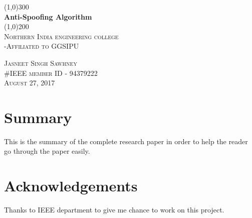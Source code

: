\documentclass{article}
\begin{document}
\begin{comment}
this is used to comment out lines.
\title{Robust Anti-Spoofing Algorithm}
\author{Innovative Coder}
\date{August 27, 2017}
\maketitle
above written code will print the report in very lame format 
the code written below is improved.
\end{comment}
\begin{titlepage}
	\begin{center}
	\line(1,0){300}\\
	[0.25 in]
	\huge{\bfseries Anti-Spoofing Algorithm}\\
	[2mm]
	\line(1,0){200}\\
	[1.5mm]
	\textsc{\LARGE Northern India engineering college}\\
	[0.75mm]
	\textsc{\Large -Affiliated to GGSIPU}\\
	[12.5cm]
	\end{center}
	
	\begin{flushright}  %
	\textsc{\large Jasneet Singh Sawhney\\
	\#IEEE member ID - 94379222\\
	August 27, 2017\\}
	\end{flushright}

\end{titlepage}

\section*{Summary} %
This is the summary of the complete research paper in order to help the reader go through the paper easily.
\cleardoublepage

\section*{Acknowledgements}
Thanks to IEEE department to give me chance to work on this project.
\cleardoublepage
\tableofcontents   %
\end{document}
